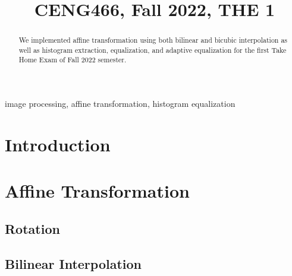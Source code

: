 \documentclass[conference]{IEEEtran}
\begin{document}
\title{CENG466, Fall 2022, THE 1\\

}

\author{
\and
{}
}

\maketitle

\begin{abstract}
We implemented affine transformation using both bilinear and bicubic interpolation as well as histogram extraction, equalization, and adaptive equalization for the first Take Home Exam of Fall 2022 semester.
\end{abstract}

\begin{IEEEkeywords}
image processing, affine transformation, histogram equalization
\end{IEEEkeywords}

\section{Introduction}

\section{Affine Transformation}

\subsection{Rotation}


\subsection{Bilinear Interpolation}
\end{document}
